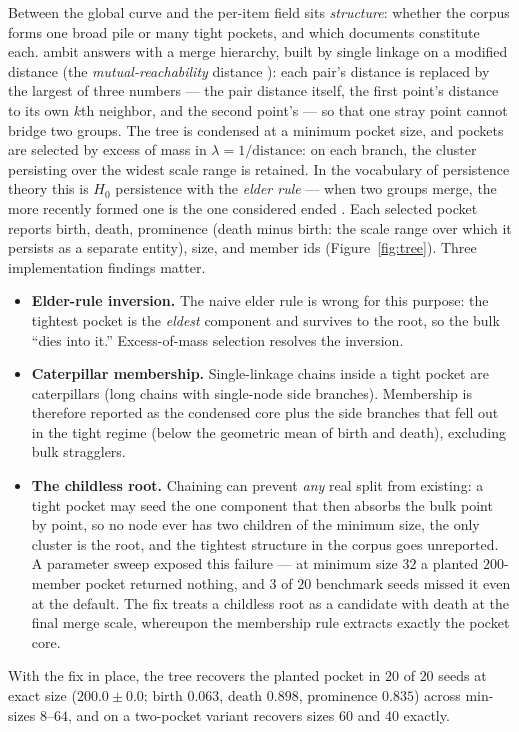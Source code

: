 \documentclass[11pt,letterpaper]{article}
\begin{document}
Between the global curve and the per-item field sits \emph{structure}:
whether the corpus forms one broad pile or many tight pockets, and which
documents constitute each. \textsf{ambit} answers with a merge hierarchy,
built by single linkage on a modified distance (the
\emph{mutual-reachability} distance \cite{campello2015}): each pair's
distance is replaced by the largest of three numbers --- the pair
distance itself, the first point's distance to its own $k$th neighbor,
and the second point's --- so that one stray point cannot bridge two
groups. The tree is condensed at a minimum pocket
size, and pockets are selected by excess of mass in $\lambda =
1/\mathrm{distance}$: on each branch, the cluster persisting over the
widest scale range is retained. In the vocabulary of persistence theory this is $H_0$ persistence
with the \emph{elder rule} --- when two groups merge, the more recently
formed one is the one considered ended
\cite{chazal2013,rolle2020}. Each selected pocket reports birth, death,
prominence (death minus birth: the scale range over which it persists as a
separate entity), size, and member ids (Figure~\ref{fig:tree}). Three
implementation findings matter.
\begin{itemize}
\item \textbf{Elder-rule inversion.} The naive elder rule is wrong for
  this purpose: the tightest pocket is the \emph{eldest} component and
  survives to the root, so the bulk ``dies into it.'' Excess-of-mass
  selection resolves the inversion.
\item \textbf{Caterpillar membership.} Single-linkage chains inside a
  tight pocket are caterpillars (long chains with single-node side
  branches). Membership is therefore reported as the condensed core plus
  the side branches that fell out in the tight regime (below the
  geometric mean of birth and death), excluding bulk stragglers.
\item \textbf{The childless root.} Chaining can prevent \emph{any} real
  split from existing: a tight pocket may seed the one component that
  then absorbs the bulk point by point, so no node ever has two children
  of the minimum size, the only cluster is the root, and the tightest
  structure in the corpus goes unreported. A parameter sweep exposed this
  failure --- at minimum size $32$ a planted $200$-member pocket returned
  nothing, and $3$ of $20$ benchmark seeds missed it even at the default.
  The fix treats a childless root as a candidate with death at the final
  merge scale, whereupon the membership rule extracts exactly the pocket
  core.
\end{itemize} With the fix in place, the tree recovers the planted pocket
in $20$ of $20$ seeds at exact size ($200.0 \pm 0.0$; birth $0.063$, death
$0.898$, prominence $0.835$) across min-sizes $8$--$64$, and on a
two-pocket variant recovers sizes $60$ and $40$ exactly.
\end{document}
